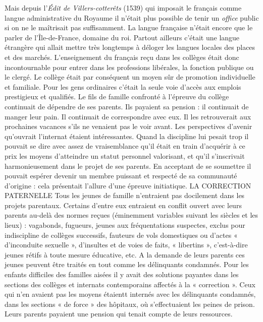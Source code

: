  Mais depuis l'\emph{Édit de Villers-cotterêts} (1539) qui imposait le français comme langue administrative du Royaume il n'était plus possible de tenir un \emph{office} public si on ne le maîtrisait pas suffisamment. La langue française n'était encore que le parler de l'Île-de-France, domaine du roi. Partout ailleurs c'était une langue étrangère qui allait mettre très longtemps à déloger les langues locales des places et des marchés. L'enseignement du français reçu dans les collèges était donc incontournable pour entrer dans les professions libérales, la fonction publique ou le clergé. 
 Le collège était par conséquent un moyen sûr de promotion individuelle et familiale. Pour les gens ordinaires c'était la seule voie d'accès aux emplois prestigieux et qualifiés. Le fils de famille confronté à l'épreuve du collège continuait de dépendre de ses parents. Ils payaient sa pension : il continuait de manger leur pain. Il continuait de correspondre avec eux. Il les retrouverait aux prochaines vacances s'ils ne venaient pas le voir avant. Les perspectives d'avenir qu'ouvrait l'internat étaient intéressantes. Quand la discipline lui pesait trop il pouvait se dire avec assez de vraisemblance qu'il était en train d'acquérir à ce prix les moyens d'atteindre un statut personnel valorisant, et qu'il s'inscrivait harmonieusement dans le projet de ses parents. En acceptant de se soumettre il pouvait espérer devenir un membre puissant et respecté de sa communauté d'origine : cela présentait l'allure d'une épreuve initiatique. 
LA CORRECTION PATERNELLE
 Tous les jeunes de famille n'entraient pas docilement dans les projets parentaux. Certains d'entre eux entraient en conflit ouvert avec leurs parents au-delà des normes reçues (éminemment variables suivant les siècles et les lieux) : vagabonds, fugueurs, jeunes aux fréquentations suspectes, exclus pour indiscipline de collèges successifs, fauteurs de vols domestiques ou d'actes « d'inconduite sexuelle », d'insultes et de voies de faits, « libertins », c'est-à-dire jeunes rétifs à toute mesure éducative, etc. 
 A la demande de leurs parents ces jeunes peuvent être traités en tout comme les délinquants condamnés. Pour les enfants difficiles des familles aisées il y avait des solutions payantes dans les sections des collèges et internats contemporains affectés à la « correction ». Ceux qui n'en avaient pas les moyens étaientt internés avec les délinquants condamnés, dans les sections « de force » des hôpitaux, où s'effectuaient les peines de prison. Leurs parents payaient une pension qui tenait compte de leurs ressources. 
